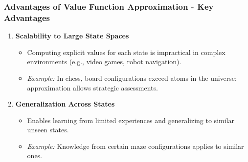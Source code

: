 \documentclass[aspectratio=169]{beamer}
\begin{document}
\begin{frame}[fragile]
    \frametitle{Advantages of Value Function Approximation - Key Advantages}
    \begin{enumerate}
        \item \textbf{Scalability to Large State Spaces}
        \begin{itemize}
            \item Computing explicit values for each state is impractical in complex environments (e.g., video games, robot navigation).
            \item \textit{Example:} In chess, board configurations exceed atoms in the universe; approximation allows strategic assessments.
        \end{itemize}

        \item \textbf{Generalization Across States}
        \begin{itemize}
            \item Enables learning from limited experiences and generalizing to similar unseen states.
            \item \textit{Example:} Knowledge from certain maze configurations applies to similar ones.
        \end{itemize}
    \end{enumerate}
\end{frame}
\end{document}

